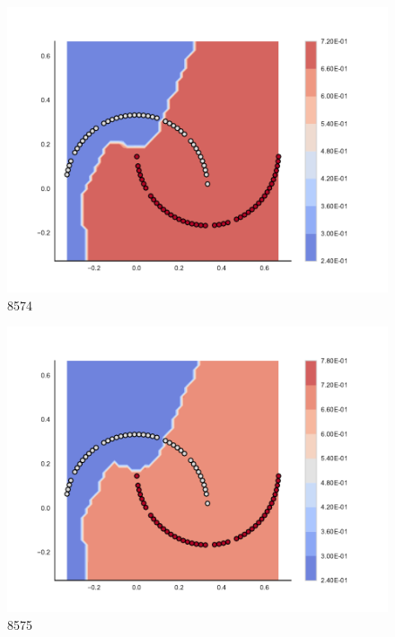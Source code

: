 \begin{subfigure}[b]{0.09\textwidth}
    \includegraphics[clip, trim=2.35cm 1.75cm 4.5cm 0cm,width=\textwidth]{img/convergence/8574.pdf}
    \caption{8574}
    \label{fig:convergence_8574}
\end{subfigure}
%
\begin{subfigure}[b]{0.09\textwidth}
    \includegraphics[clip, trim=2.35cm 1.75cm 4.5cm 0cm,width=\textwidth]{img/convergence/8575.pdf}
    \caption{8575}
    \label{fig:convergence_8575}
\end{subfigure}
%
